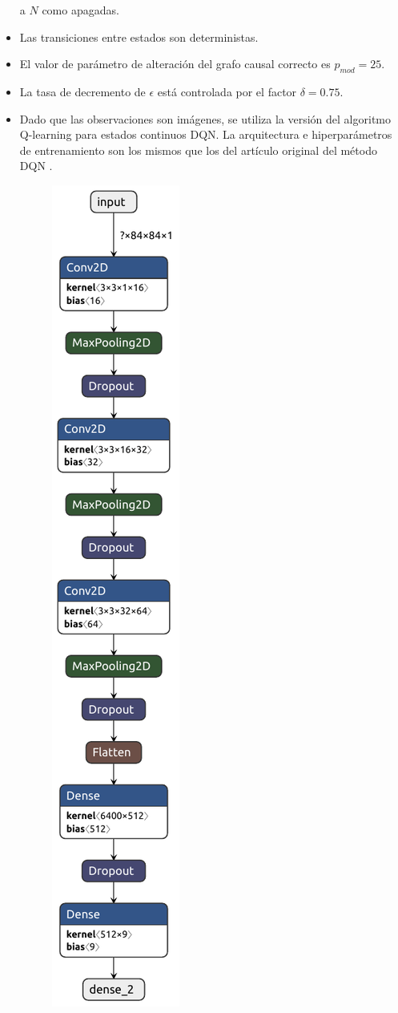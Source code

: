 \begin{itemize}
    a $N$ como apagadas. 
    \item Las transiciones entre estados son deterministas.
    \item El valor de parámetro de alteración del grafo causal correcto es
    $p_{mod} = 25$.
    \item La tasa de decremento de $\epsilon$ está controlada por el factor $\delta = 0.75$.
    \item Dado que las observaciones son imágenes, se utiliza la versión 
    del algoritmo Q-learning para estados continuos DQN. La arquitectura e hiperparámetros de entrenamiento son los mismos que los del artículo original del método DQN 
    \cite{mnih2015human}. 
    
\begin{figure}
    \centering
    \includegraphics[scale=0.8]{Chapter5/Figs/multilabel_classifier.pdf}

\end{figure}
\end{itemize}
